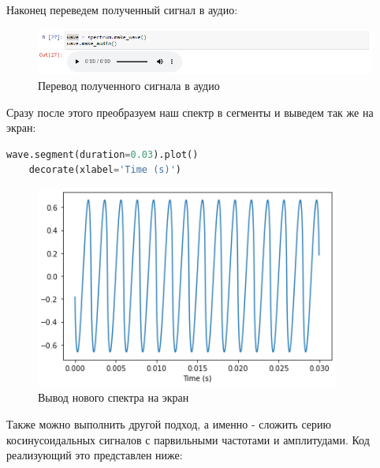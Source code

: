 \documentclass[a4paper]{article}
\begin{document}
            Наконец переведем полученный сигнал в аудио:
            
            \begin{figure}[H]
                \centering
                \includegraphics[width=\textwidth]{ex_6_sawtooth_spectrum_fun_audio.png}
                \caption{Перевод полученного сигнала в аудио}
                \label{fig:ex_6_sawtooth_spectrum_fun_audio}
            \end{figure}
            
            Сразу после этого преобразуем наш спектр в сегменты и выведем так же на экран:
            
\begin{lstlisting}[language=Python, caption= Преобразование спектра в сегменты и вывод на экран]
    wave.segment(duration=0.03).plot()
    decorate(xlabel='Time (s)')
\end{lstlisting}               
            
            \begin{figure}[H]
                \centering
                \includegraphics[width=\textwidth]{ex_6_sawtooth_spectrum_fun_segment.png}
                \caption{Вывод нового спектра на экран}
                \label{fig:ex_6_sawtooth_spectrum_fun_segment}
            \end{figure}
            
            Также можно выполнить другой подход, а именно - сложить серию косинусоидальных сигналов с парвильными частотами и амплитудами. Код реализующий это представлен ниже:
            
\end{document}
